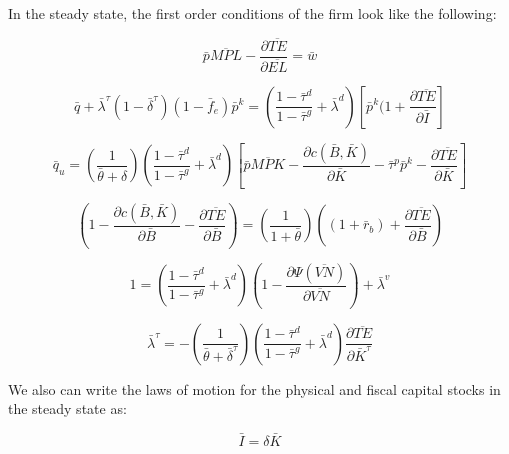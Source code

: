 In the steady state, the first order conditions of the firm look like the following:

\begin{equation}
\label{eqn:foc_l_ss}
 \bar{p}\overline{MPL} - \frac{\partial \overline{TE}}{\partial \overline{EL}}= \bar{w}
\end{equation}

 \begin{equation}
\label{eqn:foc_i_ss}
\bar{q} + \bar{\lambda}^{\tau}(1-\bar{\delta}^{\tau})(1-\bar{f}_{e})\bar{p}^{k} =  \left(\frac{1-\bar{\tau}^{d}}{1-\bar{\tau}^{g}} + \bar{\lambda}^{d}\right)\left[\bar{p}^{k}(1 + \frac{\partial \overline{TE}}{\partial \bar{I}}\right]
\end{equation}

 \begin{equation}
\label{eqn:foc_k_ss}
\bar{q}_{u} = \left(\frac{1}{\bar{\theta}+\delta}\right) \left(\frac{1-\bar{\tau}^{d}}{1-\bar{\tau}^{g}} + \bar{\lambda}^{d} \right)\left[\bar{p}\overline{MPK} - \frac{\partial c(\bar{B},\bar{K})}{\partial \bar{K}}-\bar{\tau}^{p}\bar{p}^{k}-\frac{\partial \overline{TE}}{\partial \bar{K}} \right]
\end{equation}


 \begin{equation}
\label{eqn:foc_b_ss}
\left(1-\frac{\partial c(\bar{B},\bar{K})}{\partial \bar{B}}-\frac{\partial \overline{TE}}{\partial \bar{B}}\right)=   \left(\frac{1}{1+\bar{\theta}}\right) \left((1+\bar{r}_{b})+\frac{\partial \overline{TE}}{\partial \bar{B}}\right)
\end{equation}


 \begin{equation}
\label{eqn:foc_vn_ss}
 1 = \left(\frac{1-\bar{\tau}^{d}}{1-\bar{\tau}^{g}} + \bar{\lambda}^{d}\right)\left(1-\frac{\partial \Psi(\overline{VN})}{\partial \overline{VN}}\right) + \bar{\lambda}^{v}
\end{equation}

 \begin{equation}
\label{eqn:foc_ktau_ss}
 \bar{\lambda}^{\tau} = -  \left(\frac{1}{\bar{\theta}+\bar{\delta}^{\tau}}\right)\left(\frac{1-\bar{\tau}^{d}}{1-\bar{\tau}^{g}} + \bar{\lambda}^{d} \right)\frac{\partial \overline{TE}}{\partial \bar{K}^{\tau}} 
\end{equation}

We also can write the laws of motion for the physical and fiscal capital stocks in the steady state as:

\begin{equation}
\label{eqn:lom_k_ss}
\bar{I}=\delta\bar{K}
\end{equation}


